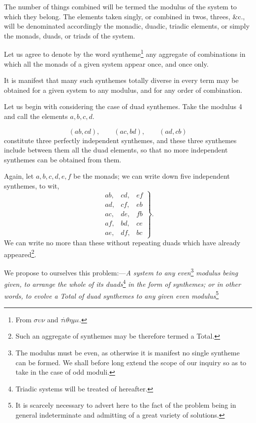 \documentclass[11pt]{article}
\newcommand{\sourcepage}[1]{\marginpar{\scriptsize p.~#1}}
\begin{document}
{{The number of things combined will be termed the modulus of the system to which they belong. The elements taken singly, or combined in twos, threes, \&c., will be denominated accordingly the monadic, duadic, triadic elements, or simply the monads, duads, or triads of the system.

Let us agree to denote by the word syntheme\footnote{From $\sigma\upsilon\nu$ and $\tau\acute{\iota}\theta\eta\mu\iota$.} any aggregate of combinations in which all the monads of a given system appear once, and once only.

It is manifest that many such synthemes totally diverse in every term may be obtained for a given system to any modulus, and for any order of combination.

Let us begin with considering the case of duad synthemes. Take the modulus 4 and call the elements $a,b,c,d$.

\[(ab,cd),\qquad (ac,bd),\qquad (ad,cb)\]
constitute three perfectly independent synthemes, and these three synthemes include between them all the duad elements, so that no more independent synthemes can be obtained from them.

\sourcepage{92}
Again, let $a,b,c,d,e,f$ be the monads; we can write down five independent synthemes, to wit,
\[
\left.\begin{array}{lll}
ab,& cd,& ef\\
ad,& cf,& eb\\
ac,& de,& fb\\
af,& bd,& ce\\
ae,& df,& bc
\end{array}\right\}.
\]
We can write no more than these without repeating duads which have already appeared\footnote{Such an aggregate of synthemes may be therefore termed a Total.}.

We propose to ourselves this problem:---\emph{A system to any even}\footnote{The modulus must be even, as otherwise it is manifest no single syntheme can be formed. We shall before long extend the scope of our inquiry so as to take in the case of odd moduli.} \emph{modulus being given, to arrange the whole of its duads}\footnote{Triadic systems will be treated of hereafter.} \emph{in the form of synthemes; or in other words, to evolve a Total of duad synthemes to any given even modulus}\footnote{It is scarcely necessary to advert here to the fact of the problem being in general indeterminate and admitting of a great variety of solutions.

}}}
\end{document}
